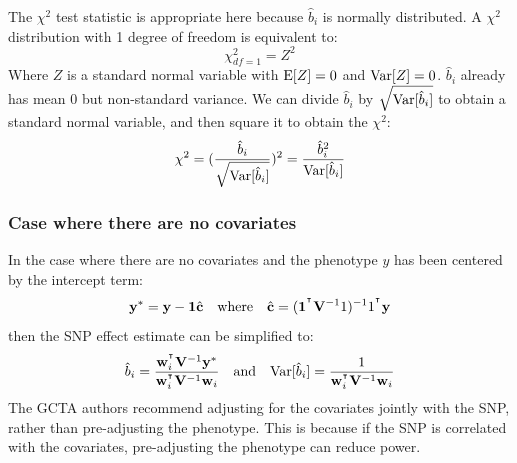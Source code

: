 \documentclass[12pt]{article}
\begin{document}
The $\chi^2$ test statistic is appropriate here because $\hat{b}_i$ is normally distributed.
A $\chi^2$ distribution with 1 degree of freedom is equivalent to:
$$ \chi^2_{df=1} = Z^2$$
Where $Z$ is a standard normal variable with $\mathrm{E}[Z]=0$ and $\mathrm{Var}[Z]=0$. $\hat{b}_i$ already has mean 0 but non-standard variance.
We can divide $\hat{b}_i$ by $\sqrt{\mathrm{Var}[\hat{b}_i]}$ to obtain a standard normal variable, and then square it to obtain the $\chi^2$:
$$ \chi^2 = (\frac{\hat{b}_i}{\sqrt{\mathrm{Var}[\hat{b}_i]}})^2 = \frac{\hat{b}_i^2}{\mathrm{Var}[\hat{b}_i]} $$

\subsubsection{Case where there are no covariates}
In the case where there are no covariates and the phenotype $y$ has been centered by the intercept term:
\begin{equation*}
    \mathbf{y}^* = \mathbf{y} - \mathbf{1} \hat{\mathbf{c}}
    \quad\mathrm{where}\quad
    \hat{\mathbf{c}} = (\mathbf{1}^{^\intercal} \mathbf{V}^{-1} 1)^{-1} 1^{^\intercal} \mathbf{y}
\end{equation*}
then the SNP effect estimate can be simplified to:
\begin{equation*}
    \hat{b}_i = \frac{\mathbf{w}_i^{^\intercal} \mathbf{V}^{-1} \mathbf{y}^*}{\mathbf{w}_i^{^\intercal} \mathbf{V}^{-1} \mathbf{w}_i}
    \quad\mathrm{and}\quad
    \mathrm{Var}[\hat{b}_i] = \frac{1}{\mathbf{w}_i^{^\intercal} \mathbf{V}^{-1} \mathbf{w}_i}
\end{equation*}
The GCTA authors recommend adjusting for the covariates jointly with the SNP, rather than pre-adjusting the phenotype.
This is because if the SNP is correlated with the covariates, pre-adjusting the phenotype can reduce power.










\end{document}
